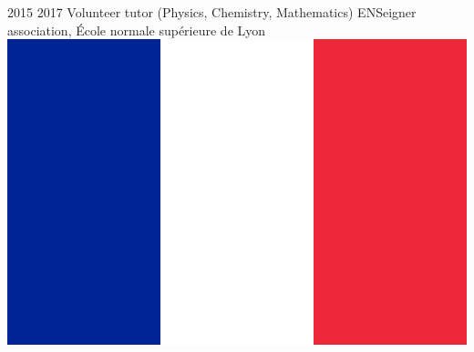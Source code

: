 \documentclass[letterpaper]{cvtemplate_en} %
\begin{document}
\begin{cvbody}
\cvitem
	{2015}
	{2017}
	{Volunteer tutor (Physics, Chemistry, Mathematics)}
	{ENSeigner association, \'Ecole normale sup\'erieure de Lyon \includegraphics[height=0.8\myheight]{fr}}
	{}{}{}
	{}
	{\vspace{5pt}
	}

\end{cvbody}
\end{document}
